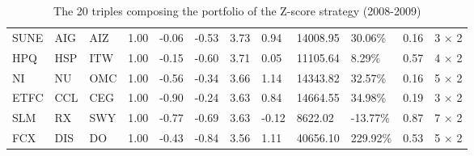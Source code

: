\documentclass[11pt,a4,twosided,singlespacing,titlepagenumber=on]{scrreprt}
\numberwithin{equation}{chapter} %
\theoremstyle{remark}
\begin{document}
\begin{table}[H]
\begin{adjustwidth}{-2.6cm}{}
\begin{tabular}{llllllllllll}
SUNE  & AIG  & AIZ  & 1.00 & -0.06 & -0.53 & 3.73 & 0.94 & 14008.95 & 30.06\%& 0.16 & 3 $\times$ 2\\
HPQ  & HSP  & ITW  & 1.00 & -0.15 & -0.60 & 3.71 & 0.05 & 11105.64 & 8.29\%& 0.57 & 4 $\times$ 2\\
NI  & NU  & OMC  & 1.00 & -0.56 & -0.34 & 3.66 & 1.14 & 14343.82 & 32.57\%& 0.16 & 5 $\times$ 2\\
ETFC  & CCL  & CEG  & 1.00 & -0.90 & -0.24 & 3.63 & 0.84 & 14664.55 & 34.98\%& 0.19 & 3 $\times$ 2\\
SLM  & RX  & SWY  & 1.00 & -0.77 & -0.69 & 3.63 & -0.12 & 8622.02 & -13.77\%& 0.87 & 7 $\times$ 2\\
FCX  & DIS  & DO  & 1.00 & -0.43 & -0.84 & 3.56 & 1.11 & 40656.10 & 229.92\%& 0.53 & 5 $\times$ 2\\
\hline
\end{tabular}
\caption{The 20 triples composing the portfolio of the Z-score strategy (2008-2009)}
\label{20_selected_triples_zscore}
\end{adjustwidth}
\end{table}
\end{document}
